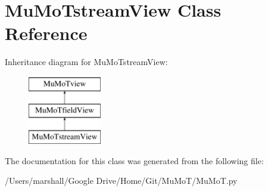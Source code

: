 \hypertarget{class_mu_mo_t_1_1_mu_mo_tstream_view}{}\section{Mu\+Mo\+Tstream\+View Class Reference}
\label{class_mu_mo_t_1_1_mu_mo_tstream_view}
Inheritance diagram for Mu\+Mo\+Tstream\+View\+:\begin{figure}[H]
\begin{center}
\leavevmode
\includegraphics[height=3.000000cm]{class_mu_mo_t_1_1_mu_mo_tstream_view}
\end{center}
\end{figure}


The documentation for this class was generated from the following file\+:\begin{DoxyCompactItemize}
\item 
/\+Users/marshall/\+Google Drive/\+Home/\+Git/\+Mu\+Mo\+T/Mu\+Mo\+T.\+py\end{DoxyCompactItemize}
